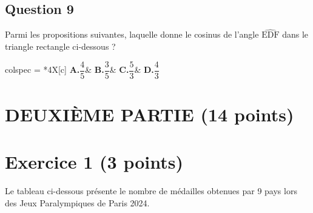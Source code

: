 \documentclass[12pt,a4paper,french]{article}
\begin{document}
\subsection*{Question 9}
Parmi les propositions suivantes, laquelle donne le cosinus de l'angle $\widehat{\mathrm{EDF}}$ dans le triangle rectangle ci-dessous ?

\medskip
\begin{tblr}{colspec = {*4{X[c]}}}
	\textbf{A.}\quad $\dfrac{4}{5}$&
	\textbf{B.}\quad $\dfrac{3}{5}$&
	\textbf{C.}\quad $\dfrac{5}{3}$&
	\textbf{D.}\quad $\dfrac{4}{3}$\\
\end{tblr}

\begin{center}
\end{center}


\section*{\centering DEUXIÈME PARTIE (14 points)}

\section*{Exercice 1 (3 points)}
Le tableau ci-dessous présente le nombre de médailles obtenues par 9 pays lors des Jeux Paralympiques de Paris 2024.
\end{document}
